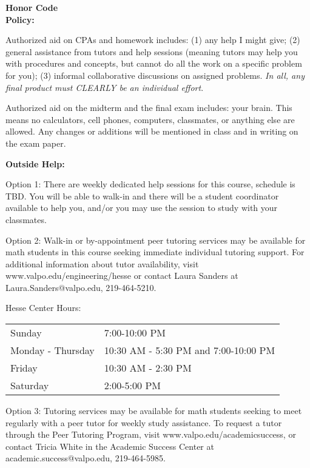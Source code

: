 \documentclass{article}
\theoremstyle{plain}
\theoremstyle{definition}
\theoremstyle{remark}
\begin{document}
\vskip0.2in \noindent
\begin{minipage}[t]{1.3in}
\textbf{Honor Code} \\ \textbf{Policy:}
\end{minipage}
\begin{minipage}[t]{5.2in}
Authorized aid on CPAs and homework includes: (1) any help I might give; (2) general assistance from tutors and help sessions (meaning tutors may help you with procedures and concepts, but cannot do all the work on a specific problem for you); (3) informal collaborative discussions on assigned problems.  \textit{In all, any final product must CLEARLY be an individual effort}.

\vspace{.2in}

Authorized aid on the midterm and the final exam includes: your brain.  This means no calculators, cell phones, computers, classmates, or anything else are allowed.  Any changes or additions will be mentioned in class and in writing on the exam paper.
\end{minipage}

\vskip0.2in \noindent
\begin{minipage}[t]{1.3in}
\textbf{Outside Help:} 
\end{minipage}
\begin{minipage}[t]{5.2in}
Option 1: There are weekly dedicated help sessions for this course, schedule is TBD.  You will be able to walk-in and there will be a student coordinator available to help you, and/or you may use the session to study with your classmates.

\vspace{.2in}

Option 2: Walk-in or by-appointment peer tutoring services may be available for math students in this course seeking immediate individual tutoring support.  For additional information about tutor availability, visit www.valpo.edu/engineering/hesse or contact Laura Sanders at Laura.Sanders@valpo.edu, 219-464-5210. \\

\vspace{.2in}

Hesse Center Hours:\\

\begin{tabular}{ll}
Sunday & 7:00-10:00 PM\\
Monday - Thursday & 10:30 AM - 5:30 PM and 7:00-10:00 PM\\
Friday & 10:30 AM  - 2:30 PM\\
Saturday & 2:00-5:00 PM
\end{tabular}

\vspace{.2in}

Option 3: Tutoring services may be available for math students seeking to meet regularly with a peer tutor for weekly study assistance. To request a tutor through the Peer Tutoring Program, visit www.valpo.edu/academicsuccess, or contact Tricia White in the Academic Success Center at academic.success@valpo.edu, 219-464-5985.

\end{minipage}
\end{document}
